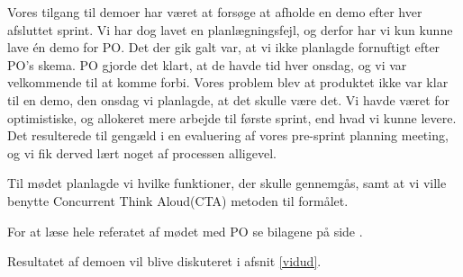 Vores tilgang til demoer har været at forsøge at afholde en demo efter hver afsluttet sprint.
Vi har dog lavet en planlægningsfejl, og derfor har vi kun kunne lave én demo for PO.
Det der gik galt var, at vi ikke planlagde fornuftigt efter PO's skema.
PO gjorde det klart, at de havde tid hver onsdag, og vi var velkommende til at komme forbi.
Vores problem blev at produktet ikke var klar til en demo, den onsdag vi planlagde, at det skulle være det.
Vi havde været for optimistiske, og allokeret mere arbejde til første sprint, end hvad vi kunne levere.
Det resulterede til gengæld i en evaluering af vores pre-sprint planning meeting, og vi fik derved lært noget af processen alligevel.
   
Til mødet planlagde vi hvilke funktioner, der skulle gennemgås, samt at vi ville benytte Concurrent Think Aloud(CTA) metoden til formålet.\cite{cta}
   
For at læse hele referatet af mødet med PO se bilagene på side \pageref{demoreferat}.

Resultatet af demoen vil blive diskuteret i afsnit \ref{vidud}.
